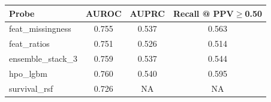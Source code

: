 \begin{tabular}{@{}lccc@{}}
\toprule
Probe & AUROC & AUPRC & Recall @ PPV$\geq$0.50\\
\midrule
feat\_missingness & 0.755 & 0.537 & 0.563\\
feat\_ratios & 0.751 & 0.526 & 0.514\\
ensemble\_stack\_3 & 0.759 & 0.537 & 0.544\\
hpo\_lgbm & 0.760 & 0.540 & 0.595\\
survival\_rsf & 0.726 & NA & NA\\
\bottomrule
\end{tabular}
